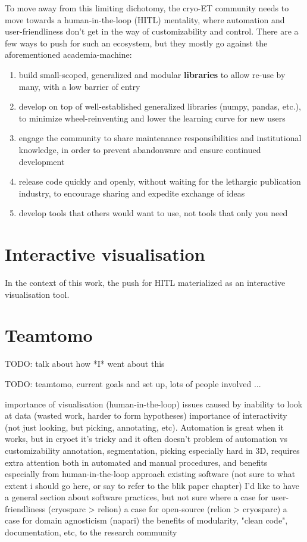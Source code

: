 To move away from this limiting dichotomy, the cryo-ET community needs to move towards a human-in-the-loop (HITL) mentality, where automation and user-friendliness don't get in the way of customizability and control.
There are a few ways to push for such an ecosystem, but they mostly go against the aforementioned academia-machine:

\begin{enumerate}[noitemsep]
    \item build small-scoped, generalized and modular \textbf{libraries} to allow re-use by many, with a low barrier of entry
    \item develop on top of well-established generalized libraries (numpy, pandas, etc.), to minimize wheel-reinventing and lower the learning curve for new users
    \item engage the community to share maintenance responsibilities and institutional knowledge, in order to prevent abandonware and ensure continued development
    \item release code quickly and openly, without waiting for the lethargic publication industry, to encourage sharing and expedite exchange of ideas
    \item develop tools that others would want to use, not tools that only you need
\end{enumerate}

\section{Interactive visualisation}

In the context of this work, the push for HITL materialized as an interactive visualisation tool.


\section{Teamtomo}

TODO: talk about how *I* went about this

TODO: teamtomo, current goals and set up, lots of people involved ...

\begin{outline}
\1 importance of visualisation (human-in-the-loop)
    \2 issues caused by inability to look at data (wasted work, harder to form hypotheses)
    \2 importance of interactivity (not just looking, but picking, annotating, etc). Automation is great when it works, but in cryoet it's tricky and it often doesn't
        \3 problem of automation vs customizability
\1 annotation, segmentation, picking
    \2 especially hard in 3D, requires extra attention both in automated and manual procedures, and benefits especially from human-in-the-loop approach
    \2 existing software (not sure to what extent i should go here, or say to refer to the blik paper chapter)
\1 I'd like to have a general section about software practices, but not sure where
    \2 a case for user-friendliness (cryosparc > relion)
    \2 a case for open-source (relion > cryosparc)
    \2 a case for domain agnosticism (napari)
    \2 the benefits of modularity, "clean code", documentation, etc, to the research community
\end{outline}


